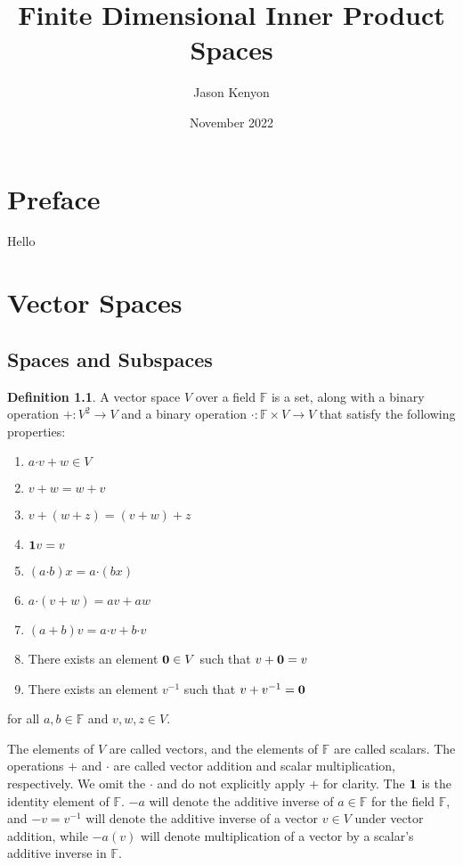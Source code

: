 \documentclass[oneside, 12pt]{book}
\title{Finite Dimensional Inner Product Spaces}
\author{Jason Kenyon}
\date{November 2022}
\theoremstyle{definition}
\newtheorem{defn}{Definition}[section]
\begin{document}
\frontmatter
\maketitle
\cleardoublepage
{}
\tableofcontents
\chapter*{Preface}
Hello
\mainmatter
\chapter{Vector Spaces}
\section{Spaces and Subspaces}
\begin{defn}
\label{defn_vspace}
  A vector space $V$ over a field $\mathbb{F}$ is a set, along with a binary operation $+: V^{2} \to V$ and a binary operation $\boldsymbol{\cdot}: \mathbb{F} \times V \to V$ that satisfy the following properties:
  \begin{enumerate}
    \item $a\boldsymbol{\cdot}v+w \in V$
    \item $v+w=w+v$
    \item $v+(w+z)=(v+w)+z$
    \item $\bold{1}v=v$
    \item $(a\boldsymbol{\cdot}b)x=a\boldsymbol{\cdot}(bx)$
    \item $a\boldsymbol{\cdot}(v+w)=av+aw$
    \item $(a+b)v=a\boldsymbol{\cdot}v+b\boldsymbol{\cdot}v$
    \item There exists an element $\bold{0} \in V$ such that $v+\bold{0}=v$
    \item There exists an element $v^{-1}$ such that $v+v^{-1}=\bold{0}$
  \end{enumerate}
  for all $a, b \in \mathbb{F}$ and $v,w,z \in V$.
\end{defn}
The elements of $V$ are called vectors, and the elements of $\mathbb{F}$ are called scalars. The operations $+$ and $\boldsymbol{\cdot}$ are called vector addition and scalar multiplication, respectively. We omit the $\boldsymbol{\cdot}$ and do not explicitly apply $+$ for clarity. The $\bold{1}$ is the identity element of $\mathbb{F}$. $-a$ will denote the additive inverse of $a \in \mathbb{F}$ for the field $\mathbb{F}$, and $-v=v^{-1}$ will denote the additive inverse of a vector $v \in V$ under vector addition, while $-a(v)$ will denote multiplication of a vector by a scalar's additive inverse in $\mathbb{F}$.
\end{document}
